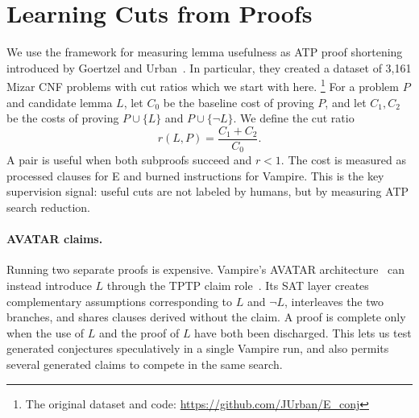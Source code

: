 \documentclass{easychair}
\newcommand{\Eprover}{E\xspace}
\newcommand{\Vampire}{Vampire\xspace}
\newcommand{\Mizar}{Mizar\xspace}
\begin{document}
\section{Learning Cuts from Proofs}
\label{sec:cuts}

We use the framework for measuring lemma usefulness as ATP proof shortening introduced by Goertzel and Urban~\cite{Urban2019}.
In particular, they created a dataset of 3,161 \Mizar CNF problems with cut ratios which we start with here.
\footnote{The original
  dataset and code: \url{https://github.com/JUrban/E_conj}}
For a problem $P$ and candidate lemma $L$, let $C_0$ be the baseline
cost of proving $P$, and let $C_1,C_2$ be the costs of proving
$P\cup\{L\}$ and $P\cup\{\neg L\}$.  We define the cut ratio
\[
        r(L,P) = \frac{C_1+C_2}{C_0}.
\]
A pair is useful when both subproofs succeed and $r<1$.  The cost is measured as
processed clauses for \Eprover and burned instructions for \Vampire.
This is the key supervision signal: useful cuts are not labeled by
humans, but by measuring ATP search reduction. %

\paragraph{AVATAR claims.}
Running two separate proofs is expensive.  \Vampire's AVATAR
architecture~\cite{Voronkov2014} can instead introduce $L$ through the TPTP claim role~\cite{Einarsdottir2024}.
Its SAT layer creates complementary assumptions corresponding to $L$
and $\neg L$, interleaves the two branches, and shares clauses derived
without the claim.  A proof is complete only when the use of $L$ and
the proof of $L$ have both been discharged.  This lets us test generated
conjectures speculatively in a single \Vampire run, and also permits
several generated claims to compete in the same search.
\end{document}
